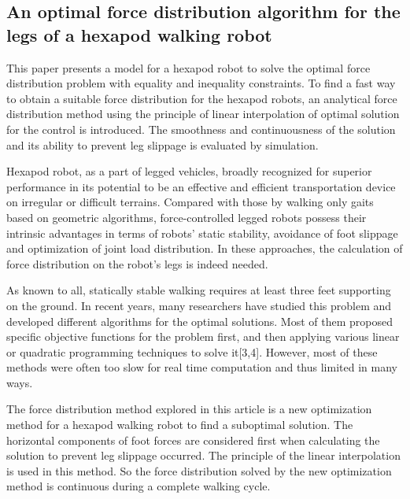 \documentclass{romjist}
\begin{document}
\subsection{An optimal force distribution algorithm for the legs of a hexapod walking robot}
\cite{3}This paper presents a model for a hexapod robot to solve the optimal force distribution problem with equality and inequality constraints. To find a fast way to obtain a suitable force distribution for the hexapod robots, an analytical force distribution method using the principle of linear interpolation of optimal solution for the control is introduced. The smoothness and continuousness of the solution and its ability to prevent leg slippage is evaluated by simulation.\par
Hexapod robot, as a part of legged vehicles, broadly recognized for superior performance in its potential to be an effective and efficient transportation device on irregular or difficult terrains. Compared with those by walking only gaits based on geometric algorithms, force-controlled legged robots possess their intrinsic advantages in terms of robots' static stability, avoidance of foot slippage and optimization of joint load distribution. In these approaches, the calculation of force distribution on the robot's legs is indeed needed.\par
As known to all, statically stable walking requires at least three feet supporting on the ground. In recent years, many researchers have studied this problem and developed different algorithms for the optimal solutions. Most of them proposed specific objective functions for the problem first, and then applying various linear or quadratic programming techniques to solve it[3,4]. However, most of these methods were often too slow for real time computation and thus limited in many ways.\par
The force distribution method explored in this article is a new optimization method for a hexapod walking robot to find a suboptimal solution. The horizontal components of foot forces are considered first when calculating the solution to prevent leg slippage occurred. The principle of the linear interpolation is used in this method. So the force distribution solved by the new optimization method is continuous during a complete walking cycle.
\end{document}
